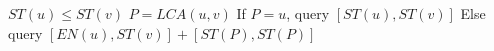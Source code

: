 $ST(u) \leq ST(v)$ \newline
$P = LCA(u, v)$ \newline
If $P = u$, query $[ST(u), ST(v)]$ \newline
Else query $[EN(u), ST(v)] + [ST(P), ST(P)]$
